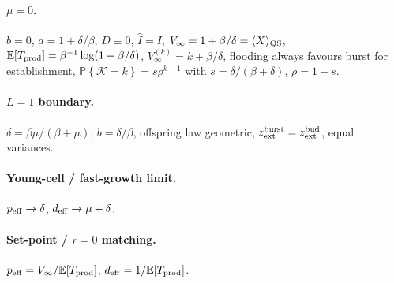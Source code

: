 \documentclass[11pt,a4paper]{article}
\newcommand{\E}{\mathbb{E}}
\newcommand{\Prob}[1]{\mathbb{P}\!\left\{#1\right\}}
\newcommand{\Ihat}{\widehat{I}}
\newcommand{\Kb}{\mathcal{K}}
\theoremstyle{plain}
\theoremstyle{definition}
\theoremstyle{remark}
\begin{document}
\paragraph{$\mu=0$.}
$b=0$, $a=1+\delta/\beta$, $D\equiv 0$, $\Ihat=I$,
$V_\infty=1+\beta/\delta=\langle X\rangle_{\rm QS}$,
$\E[T_{\rm prod}]=\beta^{-1}\log(1+\beta/\delta)$,
$V_\infty^{(k)}=k+\beta/\delta$,
flooding always favours burst for establishment,
$\Prob{\Kb=k}=s\rho^{k-1}$ with $s=\delta/(\beta+\delta)$, $\rho=1-s$.

\paragraph{$L=1$ boundary.}
$\delta=\beta\mu/(\beta+\mu)$, $b=\delta/\beta$, offspring law geometric,
$z_{\rm ext}^{\rm burst}=z_{\rm ext}^{\rm bud}$, equal variances.

\paragraph{Young-cell / fast-growth limit.}
$p_{\rm eff}\to\delta$, $d_{\rm eff}\to\mu+\delta$.

\paragraph{Set-point / $r=0$ matching.}
$p_{\rm eff}=V_\infty/\E[T_{\rm prod}]$, $d_{\rm eff}=1/\E[T_{\rm prod}]$.
\end{document}

